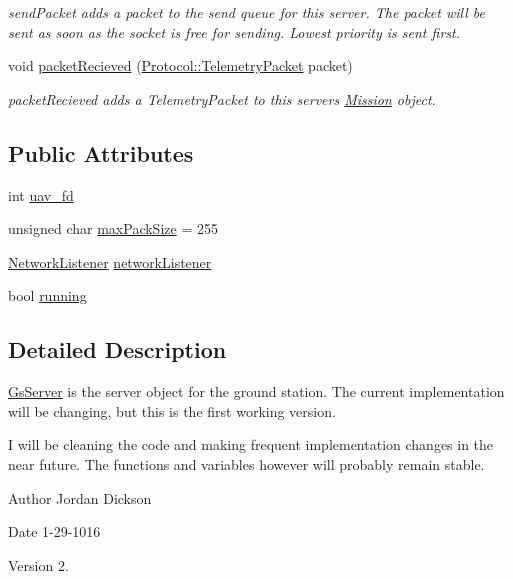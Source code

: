 \begin{DoxyCompactItemize}
\begin{DoxyCompactList}\small\item\em send\+Packet adds a packet to the send queue for this server. The packet will be sent as soon as the socket is free for sending. Lowest priority is sent first. \end{DoxyCompactList}\item 
void \hyperlink{class_gs_server_a450eb8f60b68bf82216d058cc9738e28}{packet\+Recieved} (\hyperlink{class_protocol_1_1_telemetry_packet}{Protocol\+::\+Telemetry\+Packet} packet)
\begin{DoxyCompactList}\small\item\em packet\+Recieved adds a Telemetry\+Packet to this server\textquotesingle{}s \hyperlink{class_mission}{Mission} object. \end{DoxyCompactList}\end{DoxyCompactItemize}
\subsection*{Public Attributes}
\begin{DoxyCompactItemize}
\item 
int \hyperlink{class_gs_server_aee6ff9911df099594d4483cb116ed808}{uav\+\_\+fd}
\item 
unsigned char \hyperlink{class_gs_server_a5db50514e830e5d9aeeed83e23472501}{max\+Pack\+Size} = 255
\item 
\hyperlink{class_network_listener}{Network\+Listener} \hyperlink{class_gs_server_aa115a3c8f593c29bc6d68f102dbf1941}{network\+Listener}
\item 
bool \hyperlink{class_gs_server_a720185d9a2050ae2d5ebda4e7262ba6e}{running}
\end{DoxyCompactItemize}


\subsection{Detailed Description}
\hyperlink{class_gs_server}{Gs\+Server} is the server object for the ground station. The current implementation will be changing, but this is the first working version.

I will be cleaning the code and making frequent implementation changes in the near future. The functions and variables however will probably remain stable.

\begin{DoxyAuthor}{Author}
Jordan Dickson 
\end{DoxyAuthor}
\begin{DoxyDate}{Date}
1-\/29-\/1016 
\end{DoxyDate}
\begin{DoxyVersion}{Version}
2. 
\end{DoxyVersion}


